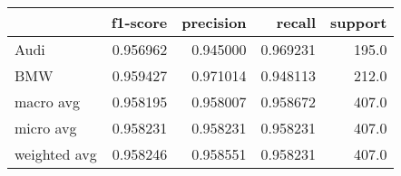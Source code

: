 \begin{tabular}{lrrrr}
\toprule
{} &  f1-score &  precision &    recall &  support \\
\midrule
Audi         &  0.956962 &   0.945000 &  0.969231 &    195.0 \\
BMW          &  0.959427 &   0.971014 &  0.948113 &    212.0 \\
macro avg    &  0.958195 &   0.958007 &  0.958672 &    407.0 \\
micro avg    &  0.958231 &   0.958231 &  0.958231 &    407.0 \\
weighted avg &  0.958246 &   0.958551 &  0.958231 &    407.0 \\
\bottomrule
\end{tabular}
